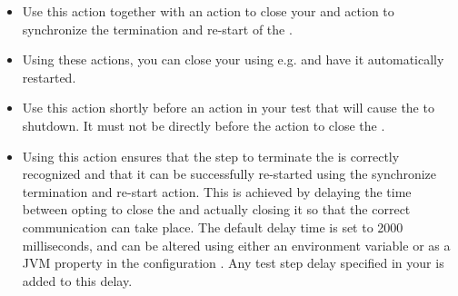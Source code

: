 

\begin{itemize}
\item Use this action together with an action to close your \gdaut{} and action to synchronize the termination and re-start of the \gdaut{}. 
\item Using these actions, you can close your \gdaut{} using e.g.  and have it automatically restarted.
\item Use this action shortly before an action in your test that will cause the \gdaut{} to shutdown. It must not be directly before the action to close the \gdaut{}. 
\item Using this action ensures that the step to terminate the \gdaut{} is correctly recognized and that it can be successfully re-started using the synchronize termination and re-start action. This is achieved by delaying the time between opting to close the \gdaut{} and actually closing it so that the correct communication can take place. The default delay time is set to 2000 milliseconds, and can be altered using either an environment variable  or as a JVM property in the \gdaut{} configuration  . Any test step delay specified in your \gdsuite{} is added to this delay.

\end{itemize}



